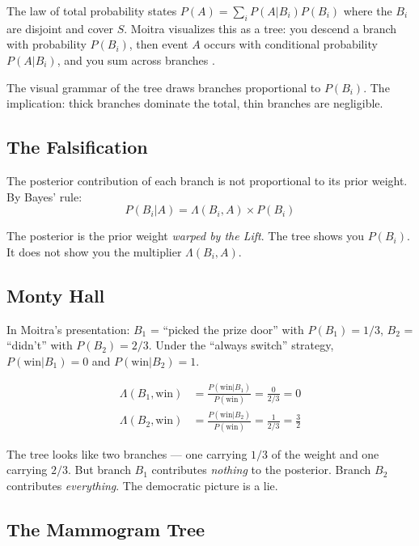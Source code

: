 \documentclass[12pt]{article}
\begin{document}
The law of total probability states $P(A) = \sum_i P(A|B_i) P(B_i)$ where the $B_i$ are disjoint and cover $S$. Moitra visualizes this as a tree: you descend a branch with probability $P(B_i)$, then event $A$ occurs with conditional probability $P(A|B_i)$, and you sum across branches \cite{moitra2024}.

The visual grammar of the tree draws branches proportional to $P(B_i)$. The implication: thick branches dominate the total, thin branches are negligible.

\subsection{The Falsification}

The posterior contribution of each branch is not proportional to its prior weight. By Bayes' rule:
\begin{equation}
P(B_i | A) = \Lambda(B_i, A) \times P(B_i)
\end{equation}

The posterior is the prior weight \textit{warped by the Lift}. The tree shows you $P(B_i)$. It does not show you the multiplier $\Lambda(B_i, A)$.

\subsection{Monty Hall}

In Moitra's presentation: $B_1$ = ``picked the prize door'' with $P(B_1) = 1/3$, $B_2$ = ``didn't'' with $P(B_2) = 2/3$. Under the ``always switch'' strategy, $P(\text{win}|B_1) = 0$ and $P(\text{win}|B_2) = 1$.

\begin{align}
\Lambda(B_1, \text{win}) &= \frac{P(\text{win}|B_1)}{P(\text{win})} = \frac{0}{2/3} = 0 \\[4pt]
\Lambda(B_2, \text{win}) &= \frac{P(\text{win}|B_2)}{P(\text{win})} = \frac{1}{2/3} = \frac{3}{2}
\end{align}

The tree looks like two branches --- one carrying $1/3$ of the weight and one carrying $2/3$. But branch $B_1$ contributes \textit{nothing} to the posterior. Branch $B_2$ contributes \textit{everything}. The democratic picture is a lie.

\subsection{The Mammogram Tree}
\end{document}
